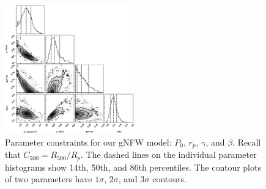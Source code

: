 \documentclass[onecolumn,traditabstract]{aa}
\begin{document}
\begin{figure}[!h]
  \centering
  \includegraphics[width=0.5\textwidth]{NIKA_ml_deproj_figs/Real_Joint_gNFW_Real_11011111_2500S_500B_100W_contour_p16cosmo.eps}
  \caption{Parameter constraints for our gNFW model: $P_0$, $r_p$, $\gamma$, and $\beta$. Recall that $C_{500} = R_{500} / R_p$.
    The dashed lines on the individual parameter histograms show 14th, 50th, and 86th percentiles. The contour plots of two
    parameters have $1\sigma$, $2\sigma$, and $3\sigma$ contours.}
  \label{fig:joint_constraints}
\end{figure}
\end{document}
